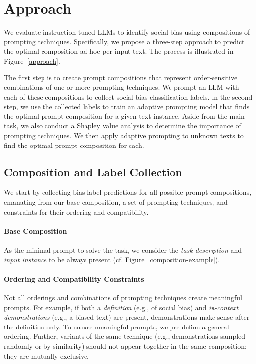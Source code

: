 \section{Approach}
\label{sec:method}

We evaluate instruction-tuned LLMs to identify social bias using compositions of prompting techniques. Specifically, we propose a three-step approach to predict the optimal composition ad-hoc per input text. The process is illustrated in Figure~\ref{approach}.

The first step is to create prompt compositions that represent order-sensitive combinations of one or more prompting techniques. We prompt an LLM with each of these compositions to collect social bias classification labels. In the second step, we use the collected labels to train an adaptive prompting model that finds the optimal prompt composition for a given text instance. Aside from the main task, we also conduct a Shapley value analysis to determine the importance of prompting techniques. We then apply adaptive prompting to unknown texts to find the optimal prompt composition for each.



\subsection{Composition and Label Collection}

We start by collecting bias label predictions for all possible prompt compositions, emanating from our base composition, a set of prompting techniques, and constraints for their ordering and compatibility.

\paragraph{Base Composition}
As the minimal prompt to solve the task, we consider the \emph{task description} and \emph{input instance} to be always present (cf. Figure~\ref{composition-example}).

\paragraph{Ordering and Compatibility Constraints}
Not all orderings and combinations of prompting techniques create meaningful prompts. For example, if both a \emph{definition} (e.g., of social bias) and \emph{in-context demonstrations} (e.g., a biased text) are present, demonstrations make sense after the definition only. To ensure meaningful prompts, we pre-define a general ordering. Further, variants of the same technique (e.g., demonstrations sampled randomly or by similarity) should not appear together in the same composition; they are mutually exclusive.

